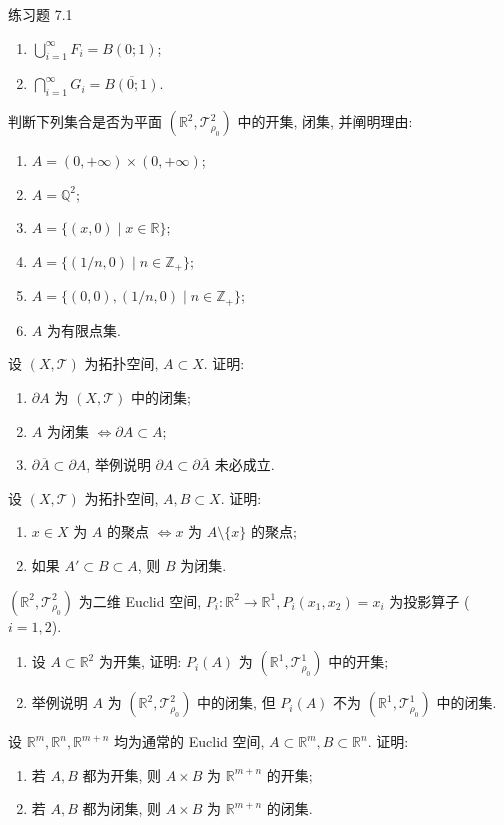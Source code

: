\begin{exblock}{练习题 7.1}
  \begin{enumerate}
    \item $\bigcup_{i=1}^\infty F_i = B(0; 1)$;
    \item $\bigcap_{i=1}^\infty G_i = \overline{B(0; 1)}$.
  \end{enumerate}
  \item 判断下列集合是否为平面 $(\mathbb{R}^2, \mathcal{T}_{\rho_0}^2)$ 中的开集, 闭集, 并阐明理由:
  \begin{enumerate}
    \item $A = (0, +\infty) \times (0, +\infty)$;
    \item $A = \mathbb{Q}^2$;
    \item $A = \{(x, 0) \mid x \in \mathbb{R}\}$;
    \item $A = \{(1/n, 0) \mid n \in \mathbb{Z}_+\}$;
    \item $A = \{(0, 0), (1/n, 0) \mid n \in \mathbb{Z}_+\}$;
    \item $A$ 为有限点集.
  \end{enumerate}
  \item 设 $(X, \mathcal{T})$ 为拓扑空间, $A \subset X$. 证明:
  \begin{enumerate}
    \item $\partial A$ 为 $(X, \mathcal{T})$ 中的闭集;
    \item $A$ 为闭集 $\iff \partial A \subset A$;
    \item $\partial \overline{A} \subset \partial A$, 举例说明 $\partial A \subset \partial \overline{A}$ 未必成立.
  \end{enumerate}
  \item 设 $(X, \mathcal{T})$ 为拓扑空间, $A, B \subset X$. 证明:
  \begin{enumerate}
    \item $x \in X$ 为 $A$ 的聚点 $\iff x$ 为 $A \setminus \{x\}$ 的聚点;
    \item 如果 $A' \subset B \subset A$, 则 $B$ 为闭集.
  \end{enumerate}
  \item $(\mathbb{R}^2, \mathcal{T}_{\rho_0}^2)$ 为二维 Euclid 空间, $P_i: \mathbb{R}^2 \to \mathbb{R}^1, P_i(x_1, x_2) = x_i$ 为投影算子 ($i = 1, 2$).
  \begin{enumerate}
    \item 设 $A \subset \mathbb{R}^2$ 为开集, 证明: $P_i(A)$ 为 $(\mathbb{R}^1, \mathcal{T}_{\rho_0}^1)$ 中的开集;
    \item 举例说明 $A$ 为 $(\mathbb{R}^2, \mathcal{T}_{\rho_0}^2)$ 中的闭集, 但 $P_i(A)$ 不为 $(\mathbb{R}^1, \mathcal{T}_{\rho_0}^1)$ 中的闭集.
  \end{enumerate}
  \item 设 $\mathbb{R}^m, \mathbb{R}^n, \mathbb{R}^{m+n}$ 均为通常的 Euclid 空间, $A \subset \mathbb{R}^m, B \subset \mathbb{R}^n$. 证明:
  \begin{enumerate}
    \item 若 $A, B$ 都为开集, 则 $A \times B$ 为 $\mathbb{R}^{m+n}$ 的开集;
    \item 若 $A, B$ 都为闭集, 则 $A \times B$ 为 $\mathbb{R}^{m+n}$ 的闭集.
  \end{enumerate}
\end{exblock}

